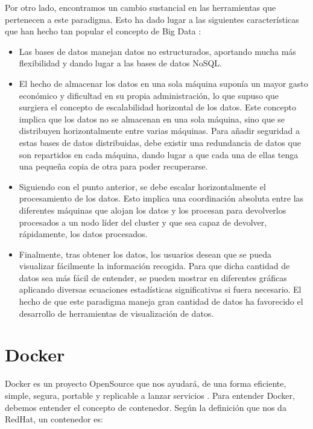 Por otro lado, encontramos un cambio sustancial en las herramientas que
pertenecen a este paradigma. Esto ha dado lugar a las siguientes
características que han hecho tan popular el concepto de Big Data
\cite{BD-6}:

\begin{itemize}
\item Las bases de datos manejan datos no estructurados, aportando mucha
  más flexibilidad y dando lugar a las bases de datos NoSQL.
\item El hecho de almacenar los datos en una sola máquina suponía un mayor
  gasto económico y dificultad en su propia administración, lo que supuso
  que surgiera el concepto de escalabilidad horizontal de los datos. Este
  concepto implica que los datos no se almacenan en una sola máquina, sino
  que se distribuyen horizontalmente entre varias máquinas. Para añadir
  seguridad a estas bases de datos distribuidas, debe existir una
  redundancia de datos que son repartidos en cada máquina, dando lugar a
  que cada una de ellas tenga una pequeña copia de otra para poder
  recuperarse.
\item Siguiendo con el punto anterior, se debe escalar horizontalmente el
  procesamiento de los datos. Esto implica una coordinación absoluta entre
  las diferentes máquinas que alojan los datos y los procesan para
  devolverlos procesados a un nodo líder del cluster y que sea capaz de
  devolver, rápidamente, los datos procesados.
\item Finalmente, tras obtener los datos, los usuarios desean que se pueda
  visualizar fácilmente la información recogida. Para que dicha cantidad de
  datos sea más fácil de entender, se pueden mostrar en diferentes
  gráficas aplicando diversas ecuaciones estadísticas significativas si
  fuera necesario. El hecho de que este paradigma maneja gran cantidad de
  datos ha favorecido el desarrollo de herramientas de visualización de
  datos.
\end{itemize}

\section{Docker\label{Docker}}


Docker es un proyecto OpenSource que nos ayudará, de una forma eficiente,
simple, segura, portable y replicable a lanzar servicios
\cite{Dck-5,Dck-6}. Para entender Docker, debemos entender el concepto de
contenedor. Según la definición que nos da RedHat, un contenedor es:

